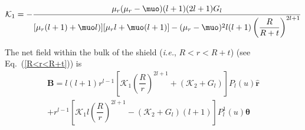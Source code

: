


\begin{equation}\label{k1}
\mathcal{K}_1=-\frac{\mu_r(\mu_r-\muo)(l+1) (2l+1)G_l}{[\mu_r(l+1)+\muo l)][\mu_r l+\muo(l+1)]-(\mu_r-\muo)^2 l(l+1)\left(\dfrac{R}{R+t}\right)^{2l+1}}
\end{equation}


The net field  within the bulk of the shield (\textit{i.e.}, $R<r<R+t$) (see Eq.~(\ref{R<r<R+t}))  is 
\begin{multline}\label{B2}
\bm B= l(l+1)r^{l-1}\left[\mathcal{K}_1 \left(\dfrac{R}{r}\right)^{2l+1}+(\mathcal{K}_2+G_l)\right] P_l(u) \bm{\hat{r}} \\+r^{l-1} \left[\mathcal{K}_1 l\left(\dfrac{R}{r}\right)^{2l+1}-(\mathcal{K}_2+G_l)(l+1) \right] P_l^1(u) \bm{\hat{\theta}}
\end{multline}



